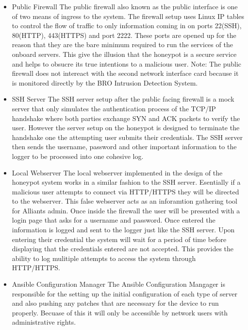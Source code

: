 \begin{itemize}
\item Public Firewall
The public firewall also known as the public interface is one of two means of ingress to the system.  The firewall setup uses Linux IP tables to control the flow of traffic to only information coming in on ports 22(SSH), 80(HTTP), 443(HTTPS) and port 2222.  These ports are opened up for the reason that they are the bare minimum required to run the services of the onboard servers.  This give the illusion that the honeypot is a secure service and helps to obsucre its true intentions to a malicious user.  Note: The public firewall does not intereact with the second network interface card because it is monitored directly by the BRO Intrusion Detection System.

\item SSH Server
The SSH server setup after the public facing firewall is a mock server that only simulates the authentication process of the TCP/IP handshake where both parties exchange SYN and ACK packets to verify the user.  However the server setup on the honeypot is designed to terminate the handshake one the attempting user submits their credentials.  The SSH server then sends the username, password and other important information to the logger to be processed into one cohesive log.

\item Local Webserver
The local webserver implemented in the design of the honeypot system works in a similar fashion to the SSH server. Esentially if a malicious user attempts to connect via HTTP/HTTPS they will be directed to the webserver.  This false webserver acts as an inforamtion gathering tool for Alliants admin.  Once inside the firewall the user will be presented with a login page that asks for a username and password.  Once entered the information is logged and sent to the logger just like the SSH server.  Upon entering their credential the system will wait for a period of time before displaying that the credentials entered are not accepted.  This provides the ability to log mulitiple attempts to access the system through HTTP/HTTPS.

\item Ansible Configuration Manager
The Ansible Configuration Mangager is responsible for the setting up the initial configuration of each type of server and also pushing any patches that are necessary for the device to run properly.  Becuase of this it will only be accessible by network users with administrative rights.


\end{itemize}
